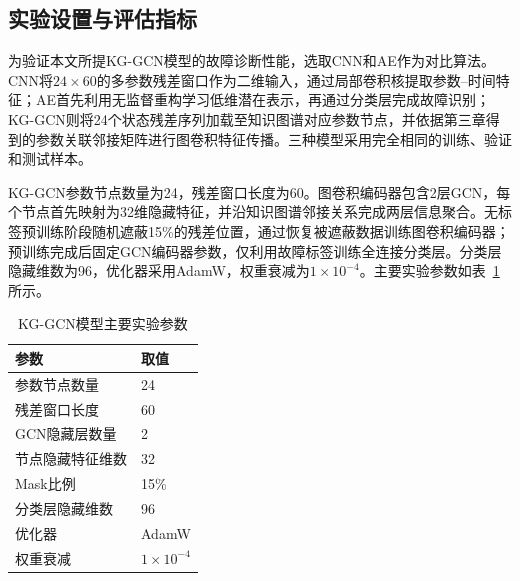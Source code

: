 \subsection{实验设置与评估指标}
\label{subsec:experiment_setting_v5}

为验证本文所提KG-GCN模型的故障诊断性能，选取CNN和AE作为对比算法。CNN将$24\times60$的多参数残差窗口作为二维输入，通过局部卷积核提取参数--时间特征；AE首先利用无监督重构学习低维潜在表示，再通过分类层完成故障识别；KG-GCN则将24个状态残差序列加载至知识图谱对应参数节点，并依据第三章得到的参数关联邻接矩阵进行图卷积特征传播。三种模型采用完全相同的训练、验证和测试样本。

KG-GCN参数节点数量为24，残差窗口长度为60。图卷积编码器包含2层GCN，每个节点首先映射为32维隐藏特征，并沿知识图谱邻接关系完成两层信息聚合。无标签预训练阶段随机遮蔽15\%的残差位置，通过恢复被遮蔽数据训练图卷积编码器；预训练完成后固定GCN编码器参数，仅利用故障标签训练全连接分类层。分类层隐藏维数为96，优化器采用AdamW，权重衰减为$1\times10^{-4}$。主要实验参数如表~\ref{tab:kg_setting_v5}所示。

\begin{table}[htbp]
    \centering
    \caption{KG-GCN模型主要实验参数}
    \label{tab:kg_setting_v5}
    \begin{tabular}{ll}
        \toprule
        参数 & 取值 \\
        \midrule
        参数节点数量 & 24 \\
        残差窗口长度 & 60 \\
        GCN隐藏层数量 & 2 \\
        节点隐藏特征维数 & 32 \\
        Mask比例 & 15\% \\
        分类层隐藏维数 & 96 \\
        优化器 & AdamW \\
        权重衰减 & $1\times10^{-4}$ \\
        \bottomrule
    \end{tabular}
\end{table}

